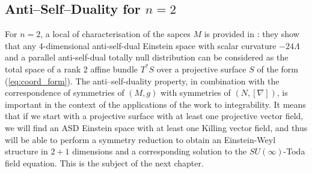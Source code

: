 \subsection{Anti--Self--Duality for $n=2$}
For $n=2$, a local of characterisation of the sapces $M$ is provided in
\cite{DM}: they show that any 4-dimensional anti-self-dual
Einstein space with scalar curvature $-24\Lambda$ and a parallel
anti-self-dual totally null distribution can be considered as the
total space of a rank 2 affine bundle $T^{*}S$ over a projective
surface $S$ of the form (\ref{eq:coord_form}). The anti--self-duality property, in combination with the correspondence of symmetries of $(M,g)$ with symmetries of $(N,[\nabla])$, is important in the context of the applications of
the work \cite{DM} to integrability. It means that
if we start with a projective surface with at least one projective
vector field, we will find an ASD Einstein space with at least one
Killing vector field, and thus will be able to perform a symmetry
reduction to obtain an Einstein-Weyl structure in $2+1$ dimensions
and a corresponding solution to the $SU(\infty)$-Toda field equation. This is the subject of the next chapter.
